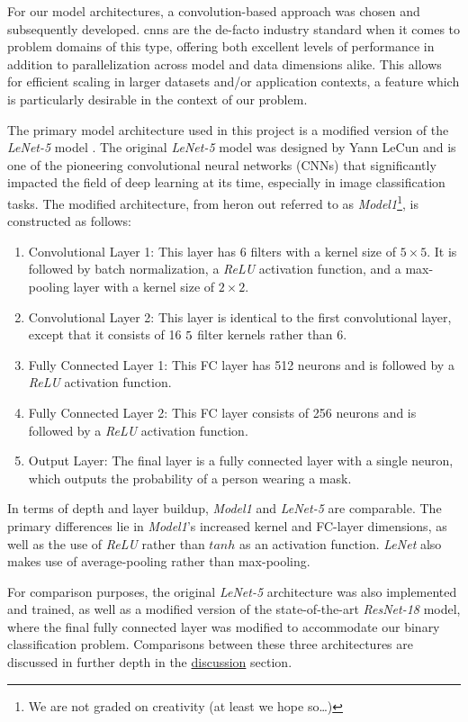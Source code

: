 \documentclass{article}
\begin{document}
For our model architectures, a convolution-based approach was chosen and subsequently developed. \Glspl{cnn} are the de-facto industry standard when it comes to problem domains of this type, offering both excellent levels of performance in addition to parallelization across model and data dimensions alike. This allows for efficient scaling in larger datasets and/or application contexts, a feature which is particularly desirable in the context of our problem.

The primary model architecture used in this project is a modified version of the \textit{LeNet-5} model \autocite{lecun98}.  The original \textit{LeNet-5} model was designed by Yann LeCun and is one of the pioneering convolutional neural networks (CNNs) that significantly impacted the field of deep learning at its time, especially in image classification tasks. The modified architecture, from heron out referred to as \textit{Model1}\footnote{We are not graded on creativity (at least we hope so\dots)},  is constructed as follows:

\begin{enumerate}
    \item Convolutional Layer 1: This layer has 6 filters with a kernel size of $5\times5$. It is followed by batch normalization, a \textit{ReLU} activation function, and a max-pooling layer with a kernel size of $2\times2$.
    \item Convolutional Layer 2: This layer is identical to the first convolutional layer, except that it consists of 16 $5 \time 5$ filter kernels rather than 6.
    \item Fully Connected Layer 1: This FC layer has 512 neurons and is followed by a \textit{ReLU} activation function.
    \item Fully Connected Layer 2: This FC layer consists of 256 neurons and is followed by a \textit{ReLU} activation function.
    \item Output Layer: The final layer is a fully connected layer with a single neuron, which outputs the probability of a person wearing a mask.
\end{enumerate}

In terms of depth and layer buildup, \textit{Model1} and \textit{LeNet-5} are comparable.
The primary differences lie in \textit{Model1}'s increased kernel and FC-layer dimensions, as well as the use of \textit{ReLU} rather than $tanh$ as an activation function. \textit{LeNet} also makes use of average-pooling rather than max-pooling.

For comparison purposes, the original \textit{LeNet-5} architecture was also implemented and trained, as well as a modified version of the state-of-the-art \textit{ResNet-18} model, where the final fully connected layer was modified to accommodate our binary classification problem. Comparisons between these three architectures are discussed in further depth in the \hyperref[sec:discussion]{discussion} section.
\end{document}
